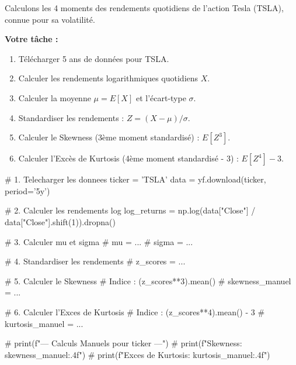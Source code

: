 \begin{exercicebox}
Calculons les 4 moments des rendements quotidiens de l'action Tesla (TSLA), connue pour sa volatilité.

\textbf{Votre tâche :}
\begin{enumerate}
    \item Télécharger 5 ans de données pour TSLA.
    \item Calculer les rendements logarithmiques quotidiens $X$.
    \item Calculer la moyenne $\mu = E[X]$ et l'écart-type $\sigma$.
    \item Standardiser les rendements : $Z = (X - \mu) / \sigma$.
    \item Calculer le Skewness (3ème moment standardisé) : $E[Z^3]$.
    \item Calculer l'Excès de Kurtosis (4ème moment standardisé - 3) : $E[Z^4] - 3$.
\end{enumerate}

\begin{codecell}
# 1. Telecharger les donnees
ticker = 'TSLA'
data = yf.download(ticker, period='5y')

# 2. Calculer les rendements log
log_returns = np.log(data["Close"] / data["Close"].shift(1)).dropna()

# 3. Calculer mu et sigma
# mu = ...
# sigma = ...

# 4. Standardiser les rendements
# z_scores = ...

# 5. Calculer le Skewness
# Indice : (z_scores**3).mean()
# skewness_manuel = ...

# 6. Calculer l'Exces de Kurtosis
# Indice : (z_scores**4).mean() - 3
# kurtosis_manuel = ...

# print(f"--- Calculs Manuels pour {ticker} ---")
# print(f"Skewness: {skewness_manuel:.4f}")
# print(f"Exces de Kurtosis: {kurtosis_manuel:.4f}")
\end{codecell}
\end{exercicebox}

